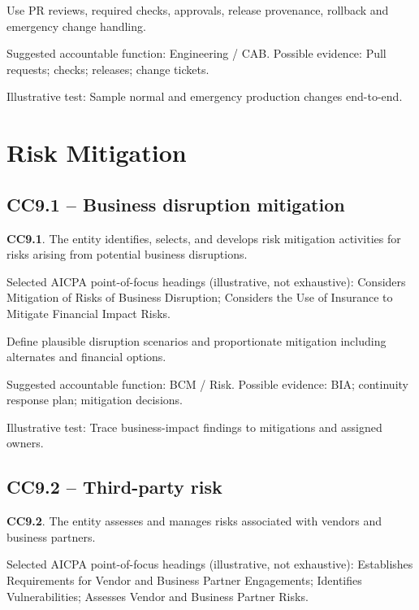 \documentclass[10pt,oneside]{report}
\begin{document}
\begin{engineeringbox}
Use PR reviews, required checks, approvals, release provenance, rollback and emergency change handling.
\end{engineeringbox}
Suggested accountable function: Engineering / CAB. Possible evidence: Pull requests; checks; releases; change tickets.

Illustrative test: Sample normal and emergency production changes end-to-end.

\section{Risk Mitigation}
\subsection*{CC9.1 -- Business disruption mitigation}
\begin{aicpabox}
\textbf{CC9.1}. The entity identifies, selects, and develops risk mitigation activities for risks arising from potential business disruptions.\par{}
\end{aicpabox}
Selected AICPA point-of-focus headings (illustrative, not exhaustive): Considers Mitigation of Risks of Business Disruption; Considers the Use of Insurance to Mitigate Financial Impact Risks.

\begin{engineeringbox}
Define plausible disruption scenarios and proportionate mitigation including alternates and financial options.
\end{engineeringbox}
Suggested accountable function: BCM / Risk. Possible evidence: BIA; continuity response plan; mitigation decisions.

Illustrative test: Trace business-impact findings to mitigations and assigned owners.

\subsection*{CC9.2 -- Third-party risk}
\begin{aicpabox}
\textbf{CC9.2}. The entity assesses and manages risks associated with vendors and business partners.\par{}
\end{aicpabox}
Selected AICPA point-of-focus headings (illustrative, not exhaustive): Establishes Requirements for Vendor and Business Partner Engagements; Identifies Vulnerabilities; Assesses Vendor and Business Partner Risks.
\end{document}

